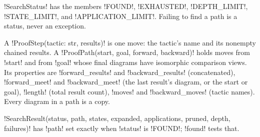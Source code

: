 \py!SearchStatus! has the members \code!FOUND!, \code!EXHAUSTED!, \code!DEPTH_LIMIT!,
\code!STATE_LIMIT!, and \code!APPLICATION_LIMIT!. Failing to find a path is a status, never an
exception.

\begin{definition}\label{def:rewriting-ppath}
A \py!ProofStep(tactic: str, results)! is one move: the tactic's name and its nonempty chained
results. A \py!ProofPath(start, goal, forward, backward)! holds moves from \py!start! and from
\py!goal! whose final diagrams have isomorphic comparison views. Its properties are
\py!forward_results! and \py!backward_results! (concatenated), \py!forward_meet! and
\py!backward_meet! (the last result's diagram, or the start or goal), \py!length! (total result
count), \py!moves! and \py!backward_moves! (tactic names). Every diagram in a path is a copy.
\end{definition}

\py!SearchResult(status, path, states, expanded, applications, pruned, depth, failures)! has
\py!path! set exactly when \py!status! is \code!FOUND!; \py!found! tests that.

